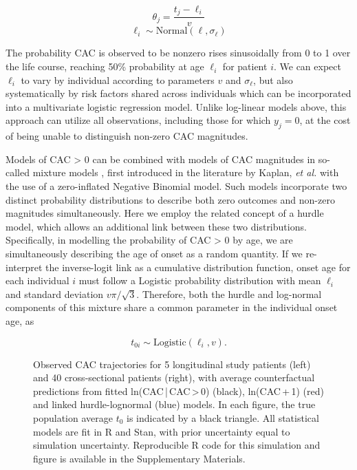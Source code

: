 \documentclass[a4paper, 10pt]{article}
\begin{document}
\begin{equation}
  \label{eq:logit}
  \theta_j = \frac{t_j - \ell_i}{v}
\end{equation}
$$
  \ell_i \sim \mathrm{Normal}(\ell, \sigma_\ell)
$$

The probability CAC is observed to be nonzero rises sinusoidally from 0 to 1 over the life course, reaching 50\% probability at age $\ell_i$ for patient $i$. We can expect $\ell_i$ to vary by individual according to parameters $v$ and $\sigma_\ell$, but also systematically by risk factors shared across individuals which can be incorporated into a multivariate logistic regression model. Unlike log-linear models above, this approach can utilize all observations, including those for which $y_j = 0$, at the cost of being unable to distinguish non-zero CAC magnitudes.

Models of CAC > 0 can be combined with models of CAC magnitudes in so-called mixture models \cite{mcelreath2020rethinking}, first introduced in the literature by Kaplan, \textit{et al.} \cite{kaplan2017tsimane} with the use of a zero-inflated Negative Binomial model. Such models incorporate two distinct probability distributions to describe both zero outcomes and non-zero magnitudes simultaneously. Here we employ the related concept of a hurdle model, which allows an additional link between these two distributions. Specifically, in modelling the probability of CAC > 0 by age, we are simultaneously describing the age of onset as a random quantity. If we re-interpret the inverse-logit link as a cumulative distribution function, onset age for each individual $i$ must follow a Logistic probability distribution with mean $\ell_i$ and standard deviation $v \pi/ \sqrt{3}$. Therefore, both the hurdle and log-normal components of this mixture share a common parameter in the individual onset age, as

$$
  t_{0i} \sim \mathrm{Logistic}(\ell_i, v).
$$

\begin{figure}[t]
  \centering
  
  \caption{Observed CAC trajectories for 5 longitudinal study patients (left) and 40 cross-sectional patients (right), with average counterfactual predictions from fitted ln(CAC\,|\,CAC\,>\,0) (black), ln(CAC\,+\,1) (red) and linked hurdle-lognormal (blue) models. In each figure, the true population average $t_0$ is indicated by a black triangle. All statistical models are fit in R and Stan, with prior uncertainty equal to simulation uncertainty. Reproducible R code for this simulation and figure is available in the Supplementary Materials.}
  \label{fig:longCrossExamples}
\end{figure}
\end{document}
